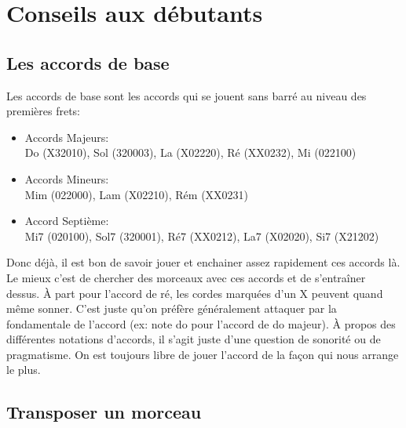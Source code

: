 \documentclass[a4paper]{article}
\begin{document}
\section{Conseils aux débutants}

\subsection{Les accords de base}

Les accords de base sont les accords qui se jouent sans barré au
niveau des premières frets:

\begin{itemize}
\item Accords Majeurs:\\ 
  Do (X32010), Sol (320003), La (X02220), Ré (XX0232), Mi (022100)\\
\item Accords Mineurs:\\
  Mim (022000), Lam (X02210), Rém (XX0231)\\
\item Accord Septième:\\
  Mi7 (020100), Sol7 (320001), Ré7 (XX0212), La7 (X02020), Si7 (X21202)\\
\end{itemize}

Donc déjà, il est bon de savoir jouer et enchainer assez rapidement
ces accords là. Le mieux c'est de chercher des morceaux avec ces
accords et de s'entraîner dessus.  À part pour l'accord de ré, les
cordes marquées d'un X peuvent quand même sonner.  C'est juste qu'on
préfère généralement attaquer par la fondamentale de l'accord (ex:
note do pour l'accord de do majeur).  À propos des différentes
notations d'accords, il s'agit juste d'une question de sonorité ou de
pragmatisme. On est toujours libre de jouer l'accord de la façon qui
nous arrange le plus.

\subsection{Transposer un morceau}
\end{document}
